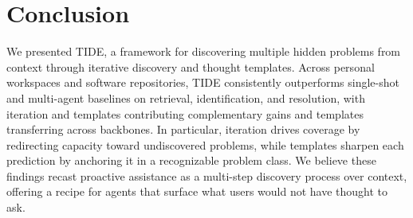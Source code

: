 \section{Conclusion}
We presented \textsc{TIDE}, a framework for discovering multiple hidden problems from context through iterative discovery and thought templates.
Across personal workspaces and software repositories, \textsc{TIDE} consistently outperforms single-shot and multi-agent baselines on retrieval, identification, and resolution, with iteration and templates contributing complementary gains and templates transferring across backbones.
In particular, iteration drives coverage by redirecting capacity toward undiscovered problems, while templates sharpen each prediction by anchoring it in a recognizable problem class.
We believe these findings recast proactive assistance as a multi-step discovery process over context, offering a recipe for agents that surface what users would not have thought to ask.
